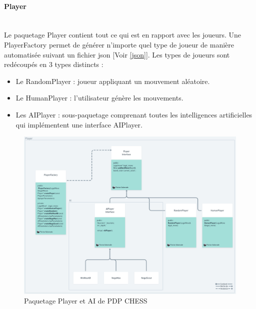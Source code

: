 \documentclass{article}
\begin{document}
\paragraph{Player}
~~\\
\newline
Le paquetage Player contient tout ce qui est en rapport avec les joueurs.
Une PlayerFactory permet de générer n'importe quel type de joueur de manière automatisée suivant un fichier json [Voir \ref{json}].
Les types de joueurs sont redécoupés en 3 types distincts : 
\begin{itemize}
    \item Le RandomPlayer : joueur appliquant un mouvement aléatoire.
    \item Le HumanPlayer : l'utilisateur génère les mouvements.
    \item Les AIPlayer : sous-paquetage comprenant toutes les intelligences artificielles qui implémentent une interface AIPlayer.
    \newline
\end{itemize}

\begin{figure}[!h]
    \centering
    \includegraphics[scale = 0.40]{img/Package/Player.png}
    \caption{Paquetage Player et AI de PDP CHESS}
    \label{pck:player}
\end{figure}

\newpage
\end{document}
